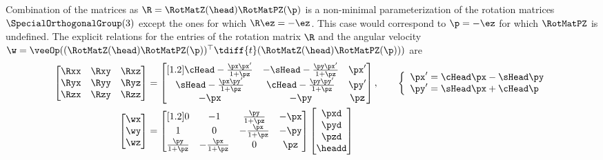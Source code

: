 Combination of the matrices as $\R = \RotMatZ(\head) \RotMatPZ(\p)$ is a non-minimal parameterization of the rotation matrices $\SpecialOrthogonalGroup(3)$ except the ones for which $\R \ez = -\ez$.
This case would correspond to $\p = -\ez$ for which $\RotMatPZ$ is undefined.
The explicit relations for the entries of the rotation matrix $\R$ and the angular velocity $\w = \veeOp( (\RotMatZ(\head) \RotMatPZ(\p))^\top \tdiff{t} (\RotMatZ(\head) \RotMatPZ(\p)))$ are
\begin{subequations}
\begin{align}
 \begin{bmatrix} \Rxx & \Rxy & \Rxz \\ \Ryx & \Ryy & \Ryz \\ \Rzx & \Rzy & \Rzz \end{bmatrix}
 &=
 \begin{bmatrix}[1.2]
  \cHead - \tfrac{\px \px'}{1+\pz} & -\sHead - \tfrac{\py \px'}{1+\pz} & \px' \\
  \sHead - \tfrac{\px \py'}{1+\pz} &  \cHead - \tfrac{\py \py'}{1+\pz} & \py' \\
  -\px & -\py & \pz \\
 \end{bmatrix},
\qquad
 \left\{ \begin{array}{l} \px' = \cHead \px - \sHead \py \\ \py' = \sHead \px + \cHead \p \end{array} \right.
\\
 \begin{bmatrix} \wx \\ \wy \\ \wz \end{bmatrix}
 &=
 \begin{bmatrix}[1.2]
  0 & -1 & \tfrac{\py}{1+\pz} & -\px \\
  1 & 0 & -\tfrac{\px}{1+\pz} & -\py \\
  \tfrac{\py}{1+\pz} & -\tfrac{\px}{1+\pz} & 0 & \pz \\
 \end{bmatrix}
 \begin{bmatrix} \pxd \\ \pyd \\ \pzd \\ \headd \end{bmatrix}

\end{align}
\end{subequations}
